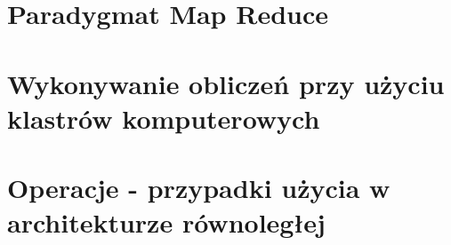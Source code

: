 \section{Paradygmat Map Reduce}
\section{Wykonywanie obliczeń przy użyciu klastrów komputerowych}
\section{Operacje - przypadki użycia w architekturze równoległej}

